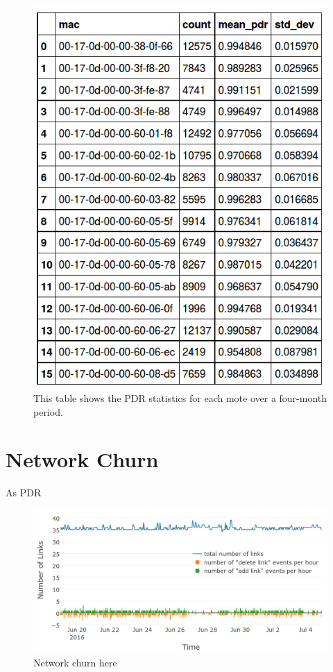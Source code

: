 \documentclass{sig-alternate}
\begin{document}
\begin{figure}
    \centering
    \includegraphics[width=0.9\columnwidth]{stats_reliability}
    \caption{This table shows the PDR statistics for each mote over a four-month period.}
    \label{fig:stats_reliability}
\end{figure}

\section{Network Churn}
\label{sec:topology}

As PDR

\begin{figure}
    \centering
    \includegraphics[width=\columnwidth]{net_churn}
    \caption{Network churn here}
    \label{fig:net_churn}
\end{figure}
\end{document}

